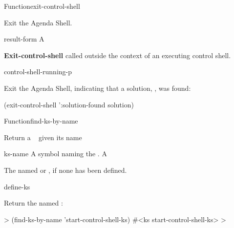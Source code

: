 \documentclass[10pt,twoside,english,pdftex]{article}
\begin{document}
\begin{functiondoc}{Function}{exit-control-shell}%
  { \superstar}
%
%
%
%

\fnsyntax

\fnpurpose Exit the Agenda Shell.

\fnpackage {}

\fnmodule {}

\fnargs
\begin{args}{result-form}
 A 
\end{args}

\fnerrors \textbf{Exit-control-shell} called outside the context of an
executing control shell.

\begin{alsos}{control-shell-running-p}
\end{alsos}

\fnexample Exit the Agenda Shell, indicating that a solution, 
, was found:
%
\W\supp
\begin{example}
  (exit-control-shell ':solution-found solution)
\end{example}

\end{functiondoc}

 
\begin{functiondoc}{Function}{find-ks-by-name}{ 
  \returns{} }
%

\fnsyntax

\fnpurpose Return a ~  given its name

\fnpackage {}

\fnmodule {}

\fnargs
\begin{args}{ks-name}
\arg[ks-name] A symbol naming the .
\arg[ks] A 
\end{args}

\fnreturns The   named 
or \nil, if none has been defined.

\begin{alsos}{define-ks}
\also[define-ks]
\also[ks]
\end{alsos}

\fnexample Return the  named :
%
\W\supp
\begin{example}
  > (find-ks-by-name 'start-control-shell-ks)
  #<ks start-control-shell-ks>
  >
\end{example}

\end{functiondoc}
\end{document}
